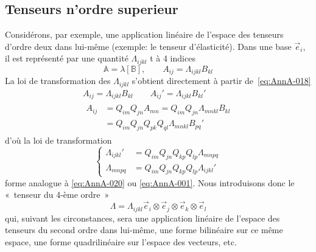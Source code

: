 \subsection{Tenseurs n'ordre superieur}
Considérons, par exemple, une application linéaire de l'espace des tenseurs d'ordre deux dans lui-même (exemple: le tenseur d'élasticité).
Dans une base $\vec{e}_i$, il est représenté par une quantité $\Lambda_{ijkl}$ t à 4 indices
\begin{equation}
    \mathbb{A} = \lambda \left[ \mathbb{B} \right], \qquad A_{ij} = \Lambda_{ijkl} B_{kl}
    \label{eq:AnnA-025}
\end{equation}
La loi de transformation des $\Lambda_{ijkl}$ s'obtient directement à partir de~\eqref{eq:AnnA-018}
\begin{gather*}
    A_{ij} = \Lambda_{ijkl} B_{kl} \qquad A_{ij}' = \Lambda_{ijkl} B_{kl}'\\
    \begin{align*}
        A_{ij} &= Q_{im} Q_{jn} A_{mn} = Q_{im} Q_{jn} \Lambda_{mnkl} B_{kl}\\
        &= Q_{im} Q_{jn} Q_{pk} Q_{ql} \Lambda_{mnkl} B_{pq}'
    \end{align*}
\end{gather*}
d'où la loi de transformation
\begin{equation}
    \left\{
    \begin{aligned}
        \Lambda_{ijkl}' &= Q_{im} Q_{jn} Q_{kp} Q_{lp} \Lambda_{mnpq}\\
        \Lambda_{mnpq} &= Q_{im} Q_{jn} Q_{kp} Q_{lp} \Lambda_{ijkl}'
    \end{aligned}
    \right.
    \label{eq:AnnA-026}
\end{equation}
forme analogue à \eqref{eq:AnnA-020} ou \eqref{eq:AnnA-001}.
Nous introduisons donc le «~tenseur du 4-ème ordre~»
\begin{equation}
    \Lambda = \Lambda_{ijkl} \vec{e}_i \otimes \vec{e}_j \otimes \vec{e}_k \otimes \vec{e}_l
    \label{eq:AnnA-027}
\end{equation}
qui, suivant les circonstances, sera une application linéaire de l'espace des tenseurs du second ordre dans lui-même, une forme bilinéaire sur ce même espace, une forme quadrilinéaire sur l'espace des vecteurs, etc.
